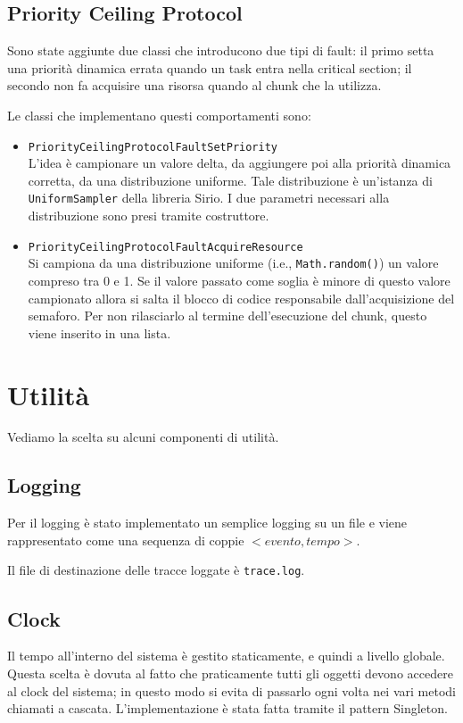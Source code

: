 \subsection{Priority Ceiling Protocol}
Sono state aggiunte due classi che introducono due tipi di fault: il primo setta una priorità dinamica errata quando un task entra nella critical section; il secondo non fa acquisire una risorsa quando al chunk che la utilizza.

\myskip

Le classi che implementano questi comportamenti sono:
\begin{itemize}
    \item \texttt{PriorityCeilingProtocolFaultSetPriority} \\
        L'idea è campionare un valore delta, da aggiungere poi alla priorità dinamica corretta, da una distribuzione uniforme. Tale distribuzione è un'istanza di \texttt{UniformSampler} della libreria Sirio. I due parametri necessari alla distribuzione sono presi tramite costruttore.
    \item \texttt{PriorityCeilingProtocolFaultAcquireResource} \\
        Si campiona da una distribuzione uniforme (i.e., \texttt{Math.random()}) un valore compreso tra 0 e 1. Se il valore passato come soglia è minore di questo valore campionato allora si salta il blocco di codice responsabile dall'acquisizione del semaforo. Per non rilasciarlo al termine dell'esecuzione del chunk, questo viene inserito in una lista.
\end{itemize}

\section{Utilità}
Vediamo la scelta su alcuni componenti di utilità.

\subsection{Logging}
Per il logging è stato implementato un semplice logging su un file e viene rappresentato come una sequenza di coppie $<evento,tempo>$.

Il file di destinazione delle tracce loggate è \texttt{trace.log}.

\subsection{Clock}
\label{subsec:clock}
Il tempo all'interno del sistema è gestito staticamente, e quindi a livello globale. Questa scelta è dovuta al fatto che praticamente tutti gli oggetti devono accedere al clock del sistema; in questo modo si evita di passarlo ogni volta nei vari metodi chiamati a cascata. L'implementazione è stata fatta tramite il pattern Singleton.

